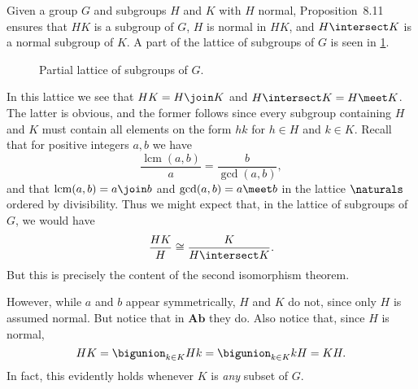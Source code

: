 \documentclass[article, a4paper, 11pt, oneside]{memoir}
\numberwithin{equation}{chapter}
\newcommand{\ncat}[1]{\mathbf{#1}} %
\newcommand{\catAb}{\ncat{Ab}} %
\theoremstyle{nonumberplain}
\DeclareMathOperator{\lcm}{lcm}
\begin{document}
\begin{remark}
    Given a group $G$ and subgroups $H$ and $K$ with $H$ normal, Proposition~8.11 ensures that $HK$ is a subgroup of $G$, $H$ is normal in $HK$, and $H \intersect K$ is a normal subgroup of $K$. A part of the lattice of subgroups of $G$ is seen in \cref{fig:lattice-of-subgroups}.
    
    \begin{figure}[!h]
        \centering
        \caption{Partial lattice of subgroups of $G$.}
        \label{fig:lattice-of-subgroups}
    \end{figure}

    In this lattice we see that $HK = H \join K$ and $H \intersect K = H \meet K$. The latter is obvious, and the former follows since every subgroup containing $H$ and $K$ must contain all elements on the form $hk$ for $h \in H$ and $k \in K$. Recall that for positive integers $a,b$ we have
    \begin{equation*}
        \frac{ \lcm(a,b) }{a}
            = \frac{b}{ \gcd(a,b) },
    \end{equation*}
    and that $\lcm(a,b) = a \join b$ and $\gcd(a,b) = a \meet b$ in the lattice $\naturals$ ordered by divisibility. Thus we might expect that, in the lattice of subgroups of $G$, we would have
    \begin{equation*}
        \frac{HK}{H}
            \cong \frac{K}{H \intersect K}.
    \end{equation*}
    But this is precisely the content of the second isomorphism theorem.

    However, while $a$ and $b$ appear symmetrically, $H$ and $K$ do not, since only $H$ is assumed normal. But notice that in $\catAb$ they do. Also notice that, since $H$ is normal,
    \begin{equation*}
        HK
            = \bigunion_{k \in K} Hk
            = \bigunion_{k \in K} kH
            = KH.
    \end{equation*}
    In fact, this evidently holds whenever $K$ is \emph{any} subset of $G$.
\end{remark}
\end{document}

